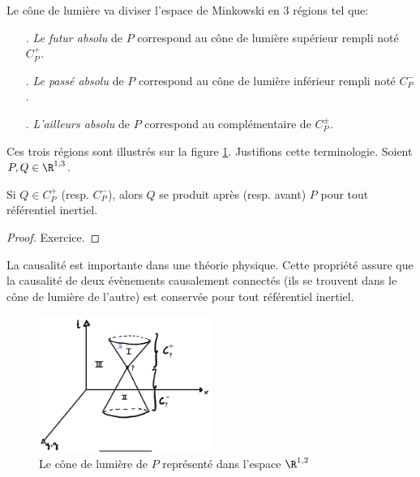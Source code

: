 \begin{theoremframe}
    \begin{notat}
        Le cône de lumière va diviser l'espace de Minkowski en 3 régions tel que:
        \begin{enumerate}
            \item[\cRM{1}.] \textit{Le futur absolu} de $P$ correspond au cône de lumière supérieur rempli noté $C_{P}^{+}$.
            \item[\cRM{2}.] \textit{Le passé absolu} de $P$ correspond au cône de lumière inférieur rempli noté $C_{P}^{-}$. 
            \item[\cRM{3}.] \textit{L'ailleurs absolu} de $P$ correspond au complémentaire de $C_P^\pm $.
        \end{enumerate}
    \end{notat}
\end{theoremframe}
Ces trois régions sont illustrés sur la figure \ref{fig:2.1}. Justifions cette terminologie. Soient $P,Q\in \R^{1,3}$.

\begin{theoremframe}
    \begin{propri}
         Si $Q \in C_P^+$ (resp. $C_P^-$), alors $Q$ se produit après (resp. avant) $P$ pour tout référentiel inertiel.
    \end{propri}
\end{theoremframe}
\begin{proof}
    Exercice.
\end{proof}
La causalité est importante dans une théorie physique. Cette propriété assure que la causalité de deux évènements causalement connectés (ils se trouvent dans le cône de lumière de l'autre) est conservée pour tout référentiel inertiel. 
    \begin{figure}[H]
     \centering
        \includegraphics[width=0.5\textwidth]{Chapitres/2. Relativité Restreinte/Images/Cone de lumière avec point Q dans 1.jpg}
        \caption{Le cône de lumière de $P$ représenté dans l'espace $\R^{1,2}$}
        \label{fig:2.1}
\end{figure}

